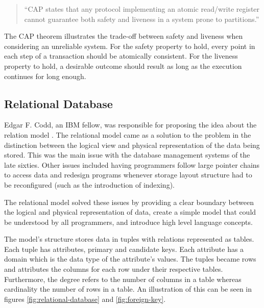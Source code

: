 \begin{quote}
    ``CAP states that any protocol implementing an atomic read/write register cannot guarantee both safety and liveness in a system prone to partitions.''
\end{quote}

The CAP theorem illustrates the trade-off between safety and liveness when considering an unreliable system. For the safety property to hold, every point in each step of a transaction should be atomically consistent. For the liveness property to hold, a desirable outcome should result as long as the execution continues for long enough.

\subsection{Relational Database}

Edgar F. Codd, an IBM fellow, was responsible for proposing the idea about the relation model \cite{relational-db}. The relational model came as a solution to the problem in the distinction between the logical view and physical representation of the data being stored. This was the main issue with the database management systems of the late sixties. Other issues included having programmers follow large pointer chains to access data and redesign programs whenever storage layout structure had to be reconfigured (such as the introduction of indexing).

The relational model solved these issues by providing a clear boundary between the logical and physical representation of data, create a simple model that could be understood by all programmers, and introduce high level language concepts.

The model's structure stores data in tuples with relations represented as tables. Each tuple has attributes, primary and candidate keys. Each attribute has a domain which is the data type of the attribute's values. The tuples became rows and attributes the columns for each row under their respective tables. Furthermore, the degree refers to the number of columns in a table whereas cardinality the number of rows in a table. An illustration of this can be seen in figures \ref{fig:relational-database} and \ref{fig:foreign-key}.

